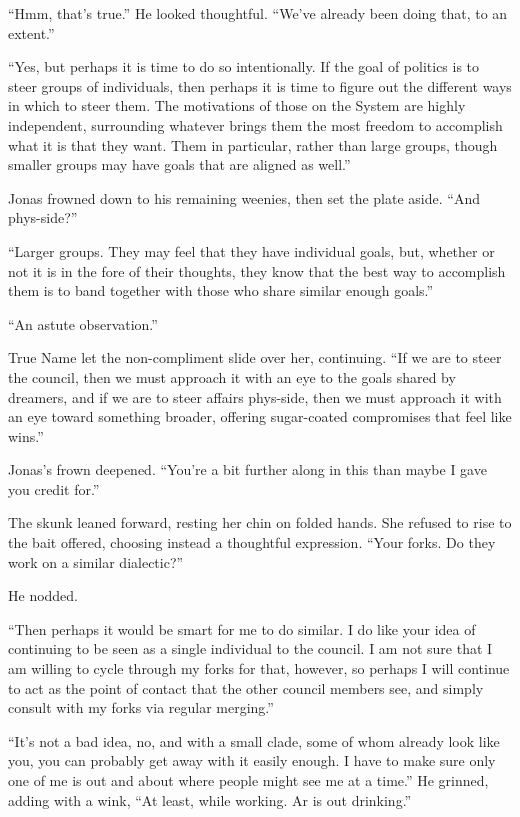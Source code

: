 ``Hmm, that's true.'' He looked thoughtful. ``We've already been doing that, to an extent.''

``Yes, but perhaps it is time to do so intentionally. If the goal of politics is to steer groups of individuals, then perhaps it is time to figure out the different ways in which to steer them. The motivations of those on the System are highly independent, surrounding whatever brings them the most freedom to accomplish what it is that they want. Them in particular, rather than large groups, though smaller groups may have goals that are aligned as well.''

Jonas frowned down to his remaining weenies, then set the plate aside. ``And phys-side?''

``Larger groups. They may feel that they have individual goals, but, whether or not it is in the fore of their thoughts, they know that the best way to accomplish them is to band together with those who share similar enough goals.''

``An astute observation.''

True Name let the non-compliment slide over her, continuing. ``If we are to steer the council, then we must approach it with an eye to the goals shared by dreamers, and if we are to steer affairs phys-side, then we must approach it with an eye toward something broader, offering sugar-coated compromises that feel like wins.''

Jonas's frown deepened. ``You're a bit further along in this than maybe I gave you credit for.''

The skunk leaned forward, resting her chin on folded hands. She refused to rise to the bait offered, choosing instead a thoughtful expression. ``Your forks. Do they work on a similar dialectic?''

He nodded.

``Then perhaps it would be smart for me to do similar. I do like your idea of continuing to be seen as a single individual to the council. I am not sure that I am willing to cycle through my forks for that, however, so perhaps I will continue to act as the point of contact that the other council members see, and simply consult with my forks via regular merging.''

``It's not a bad idea, no, and with a small clade, some of whom already look like you, you can probably get away with it easily enough. I have to make sure only one of me is out and about where people might see me at a time.'' He grinned, adding with a wink, ``At least, while working. Ar is out drinking.''

